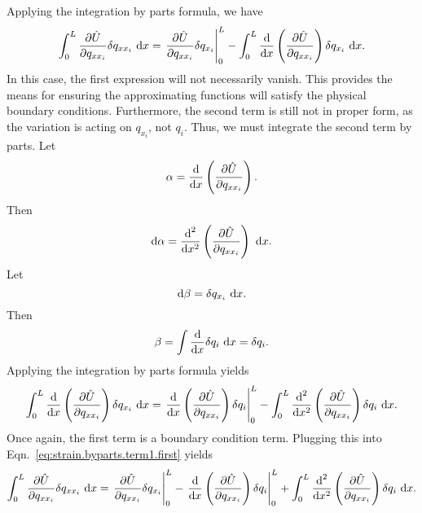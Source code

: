 Applying the integration by parts formula, we have
\begin{equation}
\int_0^L\frac{\partial \hat U}{\partial q_{xx_i}}\delta q_{xx_i}\text{ d}x = \left.\frac{\partial \hat U}{\partial q_{xx_i}}\delta q_{x_i}\right|_0^L-\int_0^L\frac{\text d}{\text dx}\left(\frac{\partial \hat{U}}{\partial q_{xx_i}}\right)\delta q_{x_i}\text{ d}x.
\label{eq:strain.byparts.term1.first}
\end{equation}
In this case, the first expression will not necessarily vanish. This provides the means for ensuring the approximating functions will satisfy the physical boundary conditions. Furthermore, the second term is still not in proper form, as the variation is acting on $q_{x_i}$, not $q_i$. Thus, we must integrate the second term by parts.
Let
\begin{equation}
\alpha = \frac{\text d}{\text dx}\left(\frac{\partial \hat{U}}{\partial q_{xx_i}}\right).
\end{equation}
Then
\begin{equation}
\text d\alpha = \frac{\text d^2}{\text dx^2}\left(\frac{\partial \hat{U}}{\partial q_{xx_i}}\right)\text{ d}x.
\end{equation}
Let
\begin{equation}
\text d\beta = \delta q_{x_i}\text{ d}x.
\end{equation}
Then
\begin{equation}
\beta = \int \frac{\text d}{\text dx}\delta q_i \text{ d}x = \delta q_i.
\end{equation}
Applying the integration by parts formula yields
\begin{equation}
\int_0^L\frac{\text d}{\text dx}\left(\frac{\partial \hat{U}}{\partial q_{xx_i}}\right)\delta q_{x_i}\text{ d}x = \left.\frac{\text d}{\text dx}\left(\frac{\partial \hat{U}}{\partial q_{xx_i}}\right)\delta q_i\right|_0^L - \int_0^L \frac{\text d^2}{\text dx^2}\left(\frac{\partial \hat{U}}{\partial q_{xx_i}}\right)\delta q_i\text{ d}x.
\end{equation}
Once again, the first term is a boundary condition term.
Plugging this into Eqn.~\ref{eq:strain.byparts.term1.first} yields
\begin{equation}
\int_0^L\frac{\partial \hat U}{\partial q_{xx_i}}\delta q_{xx_i}\text{ d}x = \left.\frac{\partial \hat U}{\partial q_{xx_i}}\delta q_{x_i}\right|_0^L-\left.\frac{\text d}{\text dx}\left(\frac{\partial \hat{U}}{\partial q_{xx_i}}\right)\delta q_i\right|_0^L+\int_0^L \frac{\text d^2}{\text dx^2}\left(\frac{\partial \hat{U}}{\partial q_{xx_i}}\right)\delta q_i\text{ d}x.
\label{eq:strain.byparts.term1}
\end{equation}
